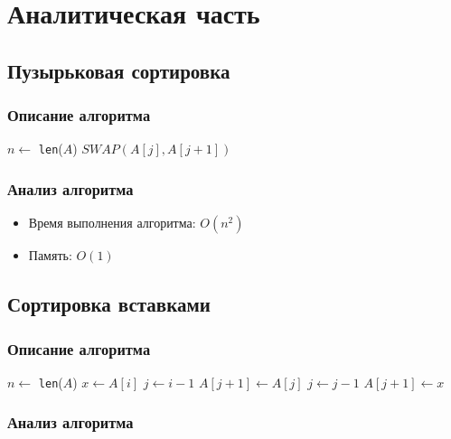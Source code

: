 \chapter{Аналитическая часть}

\section{Пузырьковая сортировка}

\subsection{Описание алгоритма}

\begin{algorithmic}
\State $n \gets$ \texttt{len}($A$)
\State $SWAP(A[j], A[j + 1])$
\EndIf
\EndFor
\EndFor
\EndProcedure
\end{algorithmic}

\subsection{Анализ алгоритма}

\begin{itemize}
\item Время выполнения алгоритма: $O(n^2)$
\item Память: $O(1)$
\end{itemize}

\section{Сортировка вставками}

\subsection{Описание алгоритма}

\begin{algorithmic}
\State $n \gets$ \texttt{len}($A$)
\State $x \gets A[i]$
\State $j \gets i - 1$
\State $A[j + 1] \gets A[j]$
\State $j \gets j - 1$
\EndWhile
\State $A[j + 1] \gets x$
\EndFor
\EndProcedure
\end{algorithmic}

\subsection{Анализ алгоритма}

